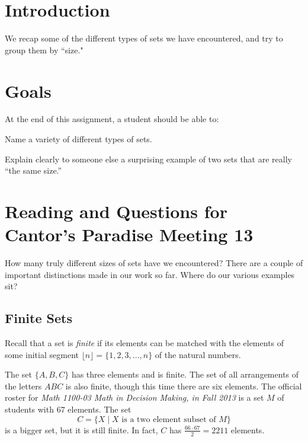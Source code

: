 \documentclass[12pt,letterpaper]{article}
\theoremstyle{definition}
\begin{document}
\setlength{\parskip}{1ex plus 0.5ex minus 0.2ex}
\setlength{\parindent}{0pt}

\pagestyle{fancy}
\cfoot{}

\section*{Introduction}
We recap some of the different types of sets we have encountered, and try to group them by ``size."

\section*{Goals}
At the end of this assignment, a student should be able to:
\begin{compactitem}
\item Name a variety of different types of sets.
\item Explain clearly to someone else a surprising example of two sets that are really ``the same size.''
\end{compactitem}

\section*{Reading and Questions for Cantor's Paradise Meeting 13}

How many truly different sizes of sets have we encountered?
There are a couple of important distinctions made in our work so far.
Where do our various examples sit?

\subsection*{Finite Sets}

Recall that a set is \emph{finite} if its elements can be matched with the elements of some initial segment $\lfloor n \rfloor = \{ 1, 2, 3, \ldots , n \}$ of the natural numbers.

The set $\{A, B, C\}$ has three elements and is finite.
The set of all arrangements of the letters $ABC$ is also finite, though this time there are six elements.
The official roster for \emph{Math 1100-03 Math in Decision Making, in Fall 2013} is a set $M$ of students with $67$ elements.
The set
\[
C = \{ X \mid \text{$X$ is a two element subset of $M$} \}
\]
is a bigger set, but it is still finite.
In fact, $C$ has $\frac{66\cdot 67}{2} = 2211$ elements.
\end{document}
